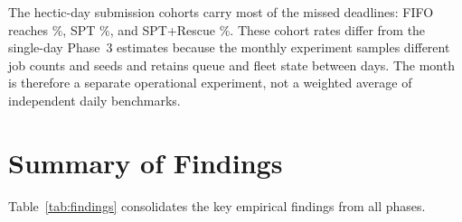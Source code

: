 {The hectic-day submission cohorts carry most of the missed deadlines: FIFO reaches \PhFourHecFIFOmiss\%, SPT \PhFourHecSPTmiss\%, and SPT+Rescue \PhFourHecRescueMiss\%. These cohort rates differ from the single-day Phase~3 estimates because the monthly experiment samples different job counts and seeds and retains queue and fleet state between days. The month is therefore a separate operational experiment, not a weighted average of independent daily benchmarks.

\section{Summary of Findings}
\label{sec:summary-of-findings}

Table~\ref{tab:findings} consolidates the key empirical findings from all phases.

}
